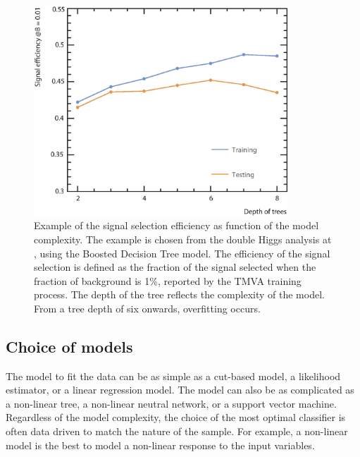 

\begin{figure}[!htbp]
\includegraphics[width=0.85\textwidth]{doubleHiggs/DepthOfTrees2}
\caption{Example of the signal selection efficiency as function of the model complexity. The example is chosen from the double Higgs analysis at , using the Boosted Decision Tree model. The efficiency of the signal selection is defined as the  fraction of the signal selected when the fraction of background  is 1\%, reported by the TMVA training process. The depth of the tree  reflects the complexity of the model.  From a tree depth of six onwards, overfitting occurs.}
\label{fig:doubleHiggsMVAovertraining}
\end{figure}


\subsection{Choice of models}

The model to fit the data can be as simple as a cut-based model, a likelihood estimator, or a linear regression model. The model can also be as complicated as a non-linear tree, a non-linear neutral network, or a support vector machine. Regardless of the model complexity, the choice of the most optimal classifier is often data driven to match the nature of the sample. For example, a non-linear model is the best to model a non-linear response to the input variables.

